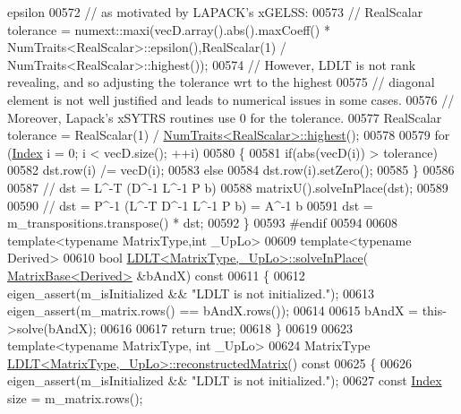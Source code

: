 \begin{DoxyCode}
{       epsilon}
00572   \textcolor{comment}{// as motivated by LAPACK's xGELSS:}
00573   \textcolor{comment}{// RealScalar tolerance = numext::maxi(vecD.array().abs().maxCoeff() *
       NumTraits<RealScalar>::epsilon(),RealScalar(1) / NumTraits<RealScalar>::highest());}
00574   \textcolor{comment}{// However, LDLT is not rank revealing, and so adjusting the tolerance wrt to the highest}
00575   \textcolor{comment}{// diagonal element is not well justified and leads to numerical issues in some cases.}
00576   \textcolor{comment}{// Moreover, Lapack's xSYTRS routines use 0 for the tolerance.}
00577   RealScalar tolerance = RealScalar(1) / \hyperlink{group___core___module_struct_eigen_1_1_num_traits}{NumTraits<RealScalar>::highest}();
00578 
00579   \textcolor{keywordflow}{for} (\hyperlink{group___cholesky___module_ad9c57eb2fb3bbccd51b9d2e111bea355}{Index} i = 0; i < vecD.size(); ++i)
00580   \{
00581     \textcolor{keywordflow}{if}(abs(vecD(i)) > tolerance)
00582       dst.row(i) /= vecD(i);
00583     \textcolor{keywordflow}{else}
00584       dst.row(i).setZero();
00585   \}
00586 
00587   \textcolor{comment}{// dst = L^-T (D^-1 L^-1 P b)}
00588   matrixU().solveInPlace(dst);
00589 
00590   \textcolor{comment}{// dst = P^-1 (L^-T D^-1 L^-1 P b) = A^-1 b}
00591   dst = m\_transpositions.transpose() * dst;
00592 \}
00593 \textcolor{preprocessor}{#endif}
00594 
00608 \textcolor{keyword}{template}<\textcolor{keyword}{typename} MatrixType,\textcolor{keywordtype}{int} \_UpLo>
00609 \textcolor{keyword}{template}<\textcolor{keyword}{typename} Derived>
00610 \textcolor{keywordtype}{bool} \hyperlink{group___cholesky___module_class_eigen_1_1_l_d_l_t}{LDLT<MatrixType,\_UpLo>::solveInPlace}(
      \hyperlink{group___core___module_class_eigen_1_1_matrix_base}{MatrixBase<Derived>} &bAndX)\textcolor{keyword}{ const}
00611 \textcolor{keyword}{}\{
00612   eigen\_assert(m\_isInitialized && \textcolor{stringliteral}{"LDLT is not initialized."});
00613   eigen\_assert(m\_matrix.rows() == bAndX.rows());
00614 
00615   bAndX = this->solve(bAndX);
00616 
00617   \textcolor{keywordflow}{return} \textcolor{keyword}{true};
00618 \}
00619 
00623 \textcolor{keyword}{template}<\textcolor{keyword}{typename} MatrixType, \textcolor{keywordtype}{int} \_UpLo>
00624 MatrixType \hyperlink{group___cholesky___module_ae3693372ca29f50d87d324dfadaae148}{LDLT<MatrixType,\_UpLo>::reconstructedMatrix}()\textcolor{keyword}{ const}
00625 \textcolor{keyword}{}\{
00626   eigen\_assert(m\_isInitialized && \textcolor{stringliteral}{"LDLT is not initialized."});
00627   \textcolor{keyword}{const} \hyperlink{group___cholesky___module_ad9c57eb2fb3bbccd51b9d2e111bea355}{Index} size = m\_matrix.rows();

\end{DoxyCode}
